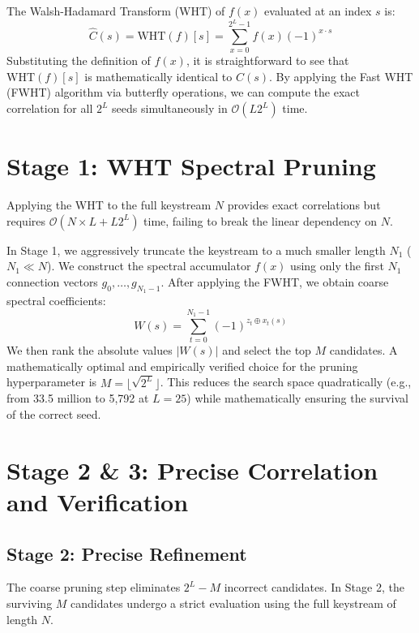 The Walsh-Hadamard Transform (WHT) of $f(x)$ evaluated at an index $s$ is:
\begin{equation}
    \hat{C}(s) = \text{WHT}(f)[s] = \sum_{x=0}^{2^L-1} f(x) (-1)^{x \cdot s}
\end{equation}
Substituting the definition of $f(x)$, it is straightforward to see that $\text{WHT}(f)[s]$ is mathematically identical to $C(s)$. By applying the Fast WHT (FWHT) algorithm via butterfly operations, we can compute the exact correlation for all $2^L$ seeds simultaneously in $\mathcal{O}(L 2^L)$ time.

\section{Stage 1: WHT Spectral Pruning}
\label{sec:stage_1}

Applying the WHT to the full keystream $N$ provides exact correlations but requires $\mathcal{O}(N \times L + L 2^L)$ time, failing to break the linear dependency on $N$. 

In Stage 1, we aggressively truncate the keystream to a much smaller length $N_1$ ($N_1 \ll N$). We construct the spectral accumulator $f(x)$ using only the first $N_1$ connection vectors $g_0, \dots, g_{N_1-1}$. 
After applying the FWHT, we obtain coarse spectral coefficients:
\begin{equation}
    W(s) = \sum_{t=0}^{N_1-1} (-1)^{z_t \oplus x_t(s)}
\end{equation}
We then rank the absolute values $|W(s)|$ and select the top $M$ candidates. A mathematically optimal and empirically verified choice for the pruning hyperparameter is $M = \lfloor \sqrt{2^L} \rfloor$. This reduces the search space quadratically (e.g., from 33.5 million to 5,792 at $L=25$) while mathematically ensuring the survival of the correct seed.

\section{Stage 2 \& 3: Precise Correlation and Verification}
\label{sec:stage_2}

\subsection{Stage 2: Precise Refinement}
The coarse pruning step eliminates $2^L - M$ incorrect candidates. In Stage 2, the surviving $M$ candidates undergo a strict evaluation using the full keystream of length $N$. 

